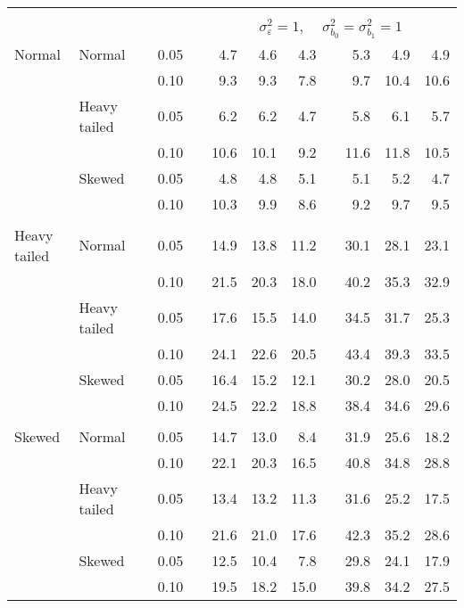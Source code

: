 \begin{table}[ht]
\begin{scriptsize}
\begin{tabular}{ll p{.1cm} c p{.1cm} rrr p{.1cm} rrr}
&&&&&&&&&&&\\
& && && \multicolumn{7}{c}{$\sigma_{\varepsilon}^2 = 1$, \ \ $\sigma_{b_0}^2 = \sigma_{b_1}^2 = 1$} \\ \cline{6-12}
\rowcolor{gray!20} Normal & Normal &  & 0.05 &  & 4.7 & 4.6 & 4.3 &  & 5.3 & 4.9 & 4.9 \\ 
\rowcolor{gray!20}    &  &  & 0.10 &  & 9.3 & 9.3 & 7.8 &  & 9.7 & 10.4 & 10.6 \\ 
\rowcolor{gray!20}    & Heavy tailed &  & 0.05 &  & 6.2 & 6.2 & 4.7 &  & 5.8 & 6.1 & 5.7 \\ 
\rowcolor{gray!20}    &  &  & 0.10 &  & 10.6 & 10.1 & 9.2 &  & 11.6 & 11.8 & 10.5 \\ 
\rowcolor{gray!20}    & Skewed &  & 0.05 &  & 4.8 & 4.8 & 5.1 &  & 5.1 & 5.2 & 4.7 \\ 
\rowcolor{gray!20}    &  &  & 0.10 &  & 10.3 & 9.9 & 8.6 &  & 9.2 & 9.7 & 9.5 \\ 
&&&&&&&&&&&\\
  Heavy tailed & Normal &  & 0.05 &  & 14.9 & 13.8 & 11.2 &  & 30.1 & 28.1 & 23.1 \\ 
   &  &  & 0.10 &  & 21.5 & 20.3 & 18.0 &  & 40.2 & 35.3 & 32.9 \\ 
   & Heavy tailed &  & 0.05 &  & 17.6 & 15.5 & 14.0 &  & 34.5 & 31.7 & 25.3 \\ 
   &  &  & 0.10 &  & 24.1 & 22.6 & 20.5 &  & 43.4 & 39.3 & 33.5 \\ 
   & Skewed &  & 0.05 &  & 16.4 & 15.2 & 12.1 &  & 30.2 & 28.0 & 20.5 \\ 
   &  &  & 0.10 &  & 24.5 & 22.2 & 18.8 &  & 38.4 & 34.6 & 29.6 \\ 
 &&&&&&&&&&&\\
  Skewed & Normal &  & 0.05 &  & 14.7 & 13.0 & 8.4 &  & 31.9 & 25.6 & 18.2 \\ 
   &  &  & 0.10 &  & 22.1 & 20.3 & 16.5 &  & 40.8 & 34.8 & 28.8 \\ 
   & Heavy tailed &  & 0.05 &  & 13.4 & 13.2 & 11.3 &  & 31.6 & 25.2 & 17.5 \\ 
   & &  & 0.10 &  & 21.6 & 21.0 & 17.6 &  & 42.3 & 35.2 & 28.6 \\ 
   & Skewed &  & 0.05 &  & 12.5 & 10.4 & 7.8 &  & 29.8 & 24.1 & 17.9 \\ 
   &  &  & 0.10 &  & 19.5 & 18.2 & 15.0 &  & 39.8 & 34.2 & 27.5 \\ 


\end{tabular}
\end{scriptsize}
\end{table}
